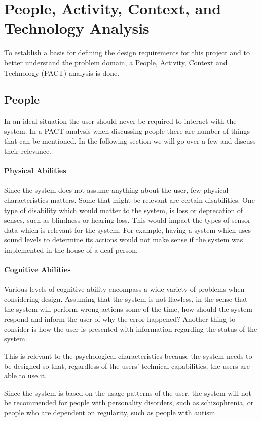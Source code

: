 \section{People, Activity, Context, and Technology Analysis}
To establish a basis for defining the design requirements for this project and
to better understand the problem domain, a People, Activity, Context and Technology (PACT) analysis\cite{DEB} is done.

\subsection{People}
In an ideal situation the user should never be required to interact with the system. In a PACT-analysis when discussing people there are number of things that can be mentioned. In the following section we will go over a few and discuss their relevance.

\paragraph{Physical Abilities}
Since the system does not assume anything about the user, few physical characteristics matters. Some that might be relevant are certain disabilities. One type of disability which would matter to the system, is loss or deprecation of senses, such as blindness or hearing loss. This would impact the types of sensor data which is relevant for the system. For example, having a system which uses sound levels to determine its actions would not make sense if the system was implemented in the house of a deaf person.

\paragraph{Cognitive Abilities}
Various levels of cognitive ability encompass a wide variety of problems
when considering design. Assuming that the system is not flawless, in the
  sense that the system will perform wrong actions some of the time, how should
the system respond and inform the user of why the error happened? Another thing
to consider is how the user is presented with information regarding the status
of the system.

This is relevant to the psychological characteristics because the system needs to be designed so that, regardless of the users' technical capabilities, the users are able to use it.

Since the system is based on the usage patterns of the user, the system will not be recommended for people with personality disorders, such as schizophrenia, or people who are dependent on regularity, such as people with autism.

